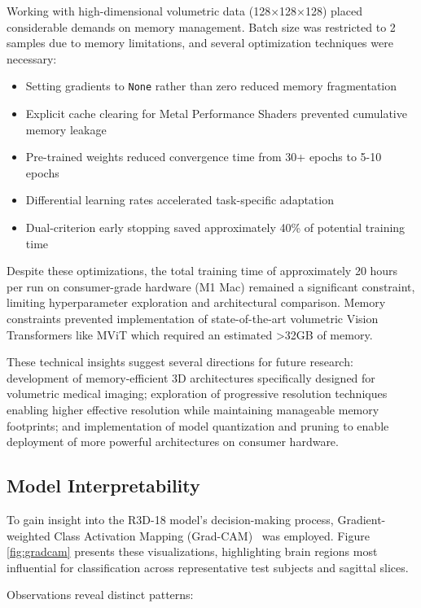 \documentclass[11pt, a4paper]{article}
\begin{document}
Working with high-dimensional volumetric data (128×128×128) placed considerable demands on memory management. Batch size was restricted to 2 samples due to memory limitations, and several optimization techniques were necessary:

\begin{itemize}
    \item Setting gradients to \texttt{None} rather than zero reduced memory fragmentation
    \item Explicit cache clearing for Metal Performance Shaders prevented cumulative memory leakage
    \item Pre-trained weights reduced convergence time from 30+ epochs to 5-10 epochs
    \item Differential learning rates accelerated task-specific adaptation
    \item Dual-criterion early stopping saved approximately 40\% of potential training time
\end{itemize}

Despite these optimizations, the total training time of approximately 20 hours per run on consumer-grade hardware (M1 Mac) remained a significant constraint, limiting hyperparameter exploration and architectural comparison. Memory constraints prevented implementation of state-of-the-art volumetric Vision Transformers like MViT which required an estimated >32GB of memory.

These technical insights suggest several directions for future research: development of memory-efficient 3D architectures specifically designed for volumetric medical imaging; exploration of progressive resolution techniques enabling higher effective resolution while maintaining manageable memory footprints; and implementation of model quantization and pruning to enable deployment of more powerful architectures on consumer hardware.

\subsection{Model Interpretability}

To gain insight into the R3D-18 model's decision-making process, Gradient-weighted Class Activation Mapping (Grad-CAM)~\cite{selvaraju2017grad} was employed. Figure \ref{fig:gradcam} presents these visualizations, highlighting brain regions most influential for classification across representative test subjects and sagittal slices.

Observations reveal distinct patterns:
\end{document}
